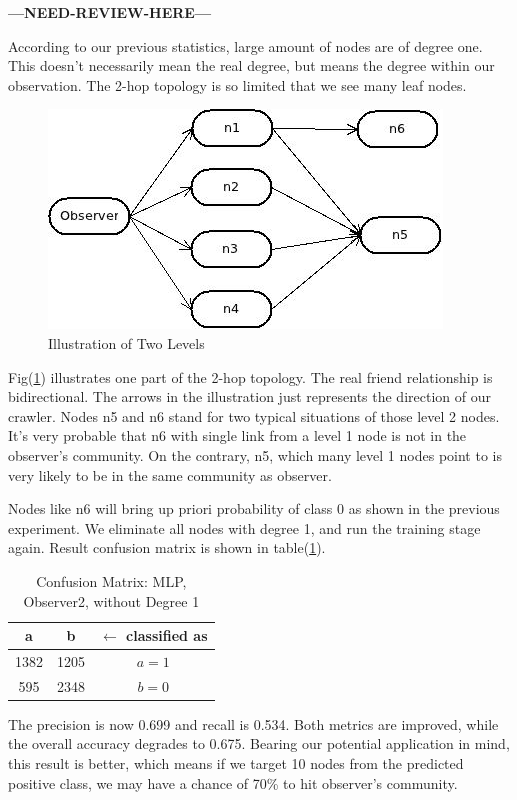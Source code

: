 \documentclass[11pt,a4paper]{article}
\newcommand{\question}{\textbf{---NEED-REVIEW-HERE---}}
\begin{document}
\question

According to our previous statistics, large amount of nodes
are of degree one. This doesn't necessarily mean the real 
degree, but means the degree within our observation. 
The 2-hop topology is so limited that we see many leaf nodes. 

\begin{figure}[htb]
	\centering
	\includegraphics[width=0.5\linewidth]{fig/illustration_2hop_level2.jpg}
	\caption{Illustration of Two Levels}
	\label{fig:illu_l2}
\end{figure}

Fig(\ref{fig:illu_l2}) illustrates one part of the 2-hop 
topology. The real friend relationship is bidirectional. 
The arrows in the illustration just represents the direction 
of our crawler. Nodes n5 and n6 stand for two typical situations 
of those level 2 nodes. It's very probable that n6 with single link 
from a level 1 node is not in the observer's community. 
On the contrary, n5, which many level 1 nodes point to is very likely
to be in the same community as observer. 

Nodes like n6 will bring up priori probability of class 0 as shown in 
the previous experiment. We eliminate all nodes with degree 1, and 
run the training stage again. Result confusion matrix is shown 
in table(\ref{tbl:cm_o2_d1}). 

\begin{table}[htb]
	\centering
	\caption{Confusion Matrix: MLP, Observer2, without Degree 1}
	\label{tbl:cm_o2_d1}
	\begin{tabular}{cc|c}
	\hline
a & b & \textbf{$\leftarrow$ classified as}\\	
	\hline
 1382 &1205 &    $a = 1$\\
  595 &2348 &    $b = 0$\\
	\hline
	\end{tabular}
\end{table}

The precision is now 0.699 and recall is  0.534. 
Both metrics are improved, while the overall accuracy 
degrades to 0.675. Bearing our potential application in mind, 
this result is better, which means if we target 10 nodes 
from the predicted positive class, we may have a chance
of 70\% to hit observer's community. 
\end{document}

